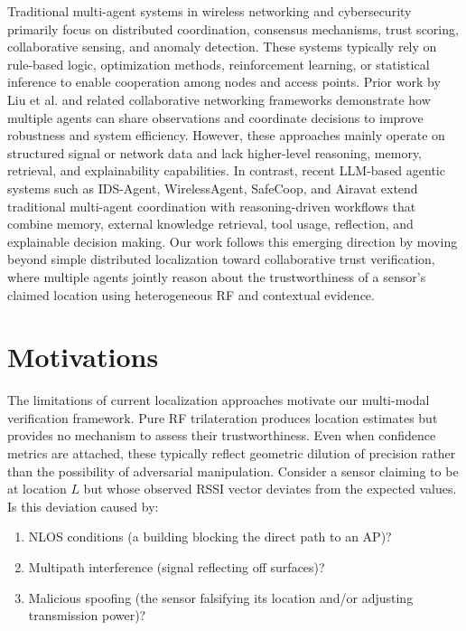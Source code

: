 \documentclass[10pt, twocolumn, letterpaper]{article}
\begin{document}
Traditional multi-agent systems in wireless networking and cybersecurity primarily focus on distributed coordination, consensus mechanisms, trust scoring, collaborative sensing, and anomaly detection. These systems typically rely on rule-based logic, optimization methods, reinforcement learning, or statistical inference to enable cooperation among nodes and access points. Prior work by Liu et al. \cite{trad1,trad2} and related collaborative networking frameworks demonstrate how multiple agents can share observations and coordinate decisions to improve robustness and system efficiency. However, these approaches mainly operate on structured signal or network data and lack higher-level reasoning, memory, retrieval, and explainability capabilities. In contrast, recent LLM-based agentic systems such as IDS-Agent, WirelessAgent, SafeCoop, and Airavat extend traditional multi-agent coordination with reasoning-driven workflows that combine memory, external knowledge retrieval, tool usage, reflection, and explainable decision making. Our work follows this emerging direction by moving beyond simple distributed localization toward collaborative trust verification, where multiple agents jointly reason about the trustworthiness of a sensor’s claimed location using heterogeneous RF and contextual evidence.
\section{Motivations}

The limitations of current localization approaches motivate our multi-modal verification framework. Pure RF trilateration produces location estimates but provides no mechanism to assess their trustworthiness. Even when confidence metrics are attached, these typically reflect geometric dilution of precision rather than the possibility of adversarial manipulation. Consider a sensor claiming to be at location $L$ but whose observed RSSI vector deviates from the expected values. Is this deviation caused by:
\begin{enumerate}
    \item NLOS conditions (a building blocking the direct path to an AP)?
    \item Multipath interference (signal reflecting off surfaces)?
    \item Malicious spoofing (the sensor falsifying its location and/or adjusting transmission power)?
\end{enumerate}
\end{document}
